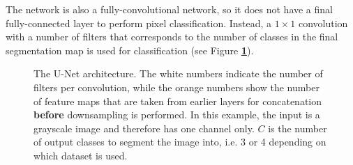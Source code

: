 The network is also a fully-convolutional network, so it does not have a final fully-connected layer to perform pixel classification. Instead, a $1 \times 1$ convolution with a number of filters that corresponds to the number of classes in the final segmentation map is used for classification (see Figure \textbf{\ref{fig:unet_arch}}).

\begin {figure}[!ht]
	\scalebox{0.75}{}
	\caption{The U-Net architecture. The white numbers indicate the number of filters per convolution, while the orange numbers show the number of feature maps that are taken from earlier layers for concatenation \textbf{before} downsampling is performed. In this example, the input is a grayscale image and therefore has one channel only. $C$ is the number of output classes to segment the image into, i.e. 3 or 4 depending on which dataset is used.}
	\label{fig:unet_arch}
\end {figure}
